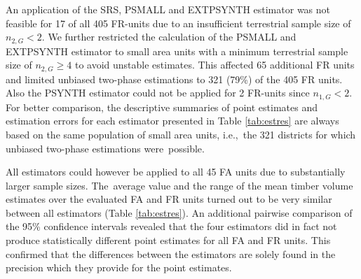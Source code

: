 \documentclass[remotesensing,article,accept,moreauthors,pdftex,10pt,a4paper]{Definitions/mdpi}
\newcommand{\psynth}{PSYNTH}
\newcommand{\psmall}{PSMALL}
\newcommand{\extpsynth}{EXTPSYNTH}
\begin{document}
An application of the SRS, \psmall{} and \extpsynth{} estimator was not feasible for 17 of all 405 FR-units due to an insufficient terrestrial sample size of $n_{2,G} < 2$. We further restricted the calculation of the \psmall{} and \extpsynth{} estimator to small area units with a minimum terrestrial sample size of $n_{2,G} \geq 4$ to avoid unstable estimates. This affected 65 additional FR units and limited unbiased two-phase estimations to 321 (79\%) of the 405 FR units. Also the \psynth{} estimator could not be applied for 2 FR-units since $n_{1,G} < 2$. For better comparison, the descriptive summaries of point estimates and estimation errors for each estimator presented in Table \ref{tab:estres} are always based on the same population of small area units, i.e.,~the 321 districts for which unbiased two-phase estimations were~possible.

All estimators could however be applied to all 45 FA units due to substantially larger sample sizes. The~average value and the range of the mean timber volume estimates over the evaluated FA and FR units turned out to be very similar between all estimators (Table \ref{tab:estres}). An additional pairwise comparison of the 95\% confidence intervals revealed that the four estimators did in fact not produce statistically different point estimates for all FA and FR units. This confirmed that the differences between the estimators are solely found in the precision which they provide for the point estimates.
\end{document}
